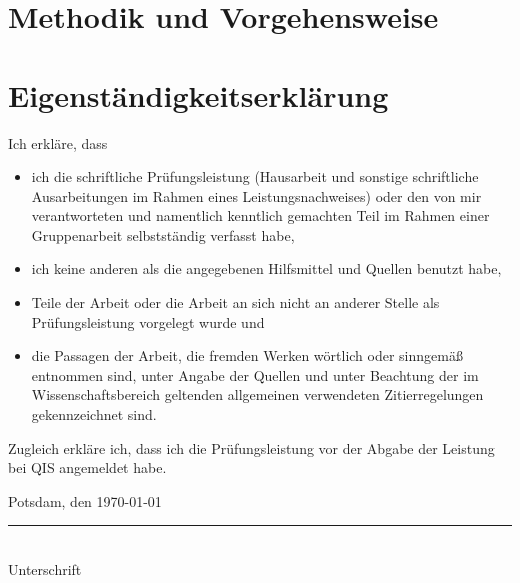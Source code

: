 \documentclass[
    a4paper,
    12pt,
    headinclude=true,
    BCOR=10mm,
]{scrreprt}
\begin{document}
\chapter{Methodik und Vorgehensweise}

\newpage
{}
\chapter*{Eigenständigkeitserklärung}
Ich erkläre, dass
\begin{itemize}
    \item ich die schriftliche Prüfungsleistung (Hausarbeit und sonstige schriftliche Ausarbeitungen im Rahmen eines Leistungsnachweises) oder den von mir verantworteten und namentlich kenntlich gemachten Teil im Rahmen einer Gruppenarbeit selbstständig verfasst habe,
    \item ich keine anderen als die angegebenen Hilfsmittel und Quellen benutzt habe,
    \item Teile der Arbeit oder die Arbeit an sich nicht an anderer Stelle als Prüfungsleistung vorgelegt wurde und
    \item die Passagen der Arbeit, die fremden Werken wörtlich oder sinngemäß entnommen sind, unter Angabe der Quellen und unter Beachtung der im Wissenschaftsbereich geltenden allgemeinen verwendeten Zitierregelungen gekennzeichnet sind.
\end{itemize}

Zugleich erkläre ich, dass ich die Prüfungsleistung vor der Abgabe der Leistung bei QIS angemeldet habe.

\vspace{2cm}

\noindent
Potsdam, den \today

\vspace{2cm}

\noindent
\rule{6cm}{0.4pt}\\
Unterschrift

\printbibliography
\newpage
\appendix
\end{document}
